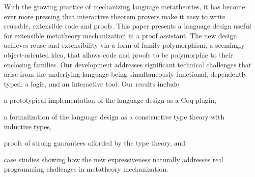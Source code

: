 
With the growing practice of mechanizing language metatheories,
it has become ever more pressing that interactive theorem provers 
make it easy to write reusable, extensible code and proofs.
%
This paper presents a language design useful for extensible metatheory
mechanization in a proof assistant.
The new design achieves reuse and extensibility via a form of family
polymorphism, a seemingly object-oriented idea, that allows code and
proofs to be polymorphic to their enclosing families.
Our development addresses significant technical challenges that arise
from the underlying language being simultaneously functional,
dependently typed, a logic, and an interactive tool.
%
Our results include
\begin{enumerate*}
\item a prototypical implementation of the language design as a Coq plugin,
\item a formalization of the language design as a constructive type theory with inductive types,
\item proofs of strong guarantees afforded by the type theory,
and 
\item case studies showing how the new expressiveness naturally addresses real
programming challenges in metatheory mechanization.
\end{enumerate*}